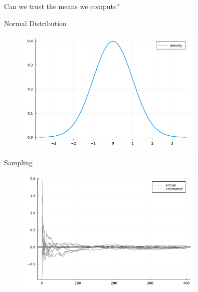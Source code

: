 \documentclass[aspectratio=169,xcolor=svgnames]{beamer}
\begin{document}
\begin{frame}
  \center
  Can we trust the means we compute?
\end{frame}

\begin{frame}{Normal Distribution}
  \begin{figure}[ht]
    \centering
    \includegraphics[width=0.8\textwidth]{figures/normal_distribution.pdf}
  \end{figure}
\end{frame}

\begin{frame}{Sampling}
  \begin{figure}[ht]
    \centering
    \includegraphics[width=0.8\textwidth]{figures/mean_error.pdf}
  \end{figure}
\end{frame}
\end{document}
